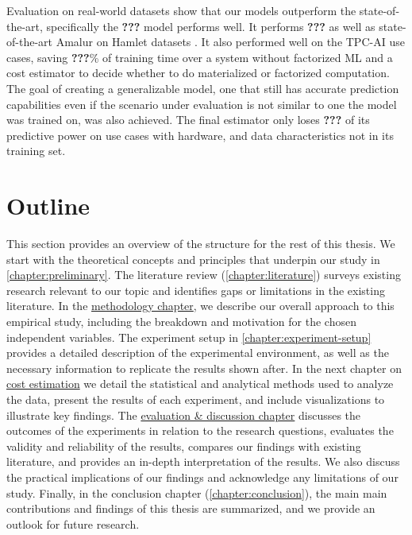 Evaluation on real-world datasets show that our models outperform the state-of-the-art, specifically the \textbf{???} model performs well. It performs \textbf{???} as well as state-of-the-art Amalur \cite{schijndel_cost_estimation} on Hamlet datasets \cite{2016hamletsigmod}. It also performed well on the TPC-AI use cases, saving \textbf{???}\% of training time over a system without factorized ML and a cost estimator to decide whether to do materialized or factorized computation. The goal of creating a generalizable model, one that still has accurate prediction capabilities even if the scenario under evaluation is not similar to one the model was trained on, was also achieved. The final estimator only loses \textbf{???} of its predictive power on use cases with hardware, and data characteristics not in its training set.


\section{Outline}
This section provides an overview of the structure for the rest of this thesis. We start with the theoretical concepts and principles that underpin our study in \autoref{chapter:preliminary}. The literature review (\autoref{chapter:literature}) surveys existing research relevant to our topic and identifies gaps or limitations in the existing literature. In the \hyperref[chapter:methodology]{methodology chapter}, we describe our overall approach to this empirical study, including the breakdown and motivation for the chosen independent variables. The experiment setup in \autoref{chapter:experiment-setup} provides a detailed description of the experimental environment, as well as the necessary information to replicate the results shown after. In the next chapter on \hyperref[chapter:cost-estimations]{cost estimation} we detail the statistical and analytical methods used to analyze the data, present the results of each experiment, and include visualizations to illustrate key findings. The \hyperref[chapter:evaluation-discussion]{evaluation \& discussion chapter} discusses the outcomes of the experiments in relation to the research questions, evaluates the validity and reliability of the results, compares our findings with existing literature, and provides an in-depth interpretation of the results. We also discuss the practical implications of our findings and acknowledge any limitations of our study. Finally, in the conclusion chapter (\autoref{chapter:conclusion}), the main main contributions and findings of this thesis are summarized, and we provide an outlook for future research.

